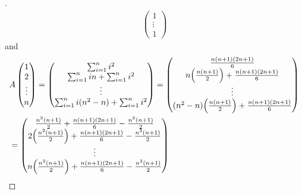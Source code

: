\begin{proof}[]
\begin{align*}
\begin{pmatrix}
			                                                                       1      \\
			                                                                       \vdots \\
			                                                                       1
		                                                                       \end{pmatrix}
	\end{align*}
	and
	\begin{align*}
		 & A \begin{pmatrix}
			     1      \\
			     2      \\
			     \vdots \\
			     n
		     \end{pmatrix} = \begin{pmatrix}
			                     \sum_{i = 1}^n i^2                     \\
			                     \sum_{i = 1}^n in + \sum_{i = 1}^n i^2 \\
			                     \vdots                                 \\
			                     \sum_{i = 1}^n i(n^2 - n) + \sum_{i = 1}^n i^2
		                     \end{pmatrix} = \begin{pmatrix}
			                                     \frac{n(n + 1)(2n + 1)}{6}                             \\
			                                     n \pa{\frac{n(n + 1)}{2}} + \frac{n(n + 1)(2n + 1)}{6} \\
			                                     \vdots                                                 \\
			                                     (n^2 - n) \pa{\frac{n(n + 1)}{2}} + \frac{n(n + 1)(2n + 1)}{6}
		                                     \end{pmatrix}         \\
		 & = \begin{pmatrix}
			     \frac{n^2(n + 1)}{2} + \frac{n(n + 1)(2n + 1)}{6} - \frac{n^2(n + 1)}{2}        \\
			     2 \pa{\frac{n^2(n + 1)}{2}} + \frac{n(n + 1)(2n + 1)}{6} - \frac{n^2(n + 1)}{2} \\
			     \vdots                                                                          \\
			     n \pa{\frac{n^2(n + 1)}{2}} + \frac{n(n + 1)(2n + 1)}{6} - \frac{n^2(n + 1)}{2}

\end{pmatrix}
\end{align*}
\end{proof}

